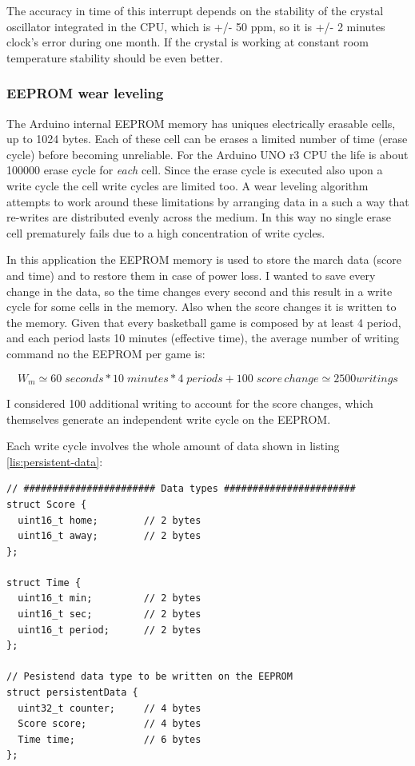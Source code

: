 \documentclass[11pt,english]{article}
\begin{document}
The accuracy in time of this interrupt depends on the stability of the crystal oscillator integrated in the CPU, 
which is +/- 50 ppm, so it is +/- 2 minutes clock's error during one month. If the crystal is working at constant 
room temperature stability should be even better.  



\subsubsection{EEPROM wear leveling} \label{subsubsec:wear-level}

The Arduino internal EEPROM memory has uniques electrically erasable cells, up to 1024 bytes. Each of these 
cell can be erases a limited number of time (erase cycle) before becoming unreliable. For the Arduino UNO r3
CPU the life is about 100000 erase cycle for \emph{each} cell. Since the erase cycle is executed 
also upon a write cycle the cell write cycles are limited too. A wear leveling algorithm attempts to work around 
these limitations by arranging data in a such a way that re-writes are distributed evenly across the medium. 
In this way no single erase cell prematurely fails due to a high concentration of write cycles. 

In this application the EEPROM memory is used to store the march data (score and time) and to restore them in 
case of power loss. I wanted to save every change in the data, so the time changes every second and this result 
in a write cycle for some cells in the memory. Also when the score changes it is written to the memory. 
Given that every basketball game is composed by at least 4 period, and each period lasts 10 minutes (effective 
time), the average number of writing command no the EEPROM per game is:

\[
W_m \simeq 60 \; seconds * 10 \; minutes * 4 \; periods + 100 \; score \, change \simeq 2500 writings
\]

I considered 100 additional writing to account for the score changes, which themselves generate an independent 
write cycle on the EEPROM.  

Each write cycle involves the whole amount of data shown in listing \ref{lis:persistent-data}:

%
\begin{lstlisting}[label=lis:persistent-data,caption=Persistent data type]
// ####################### Data types #######################
struct Score {
  uint16_t home;        // 2 bytes
  uint16_t away;        // 2 bytes
};

struct Time {
  uint16_t min;         // 2 bytes
  uint16_t sec;         // 2 bytes
  uint16_t period;      // 2 bytes
};

// Pesistend data type to be written on the EEPROM
struct persistentData {
  uint32_t counter;     // 4 bytes
  Score score;          // 4 bytes
  Time time;            // 6 bytes
};
\end{lstlisting}
\end{document}
